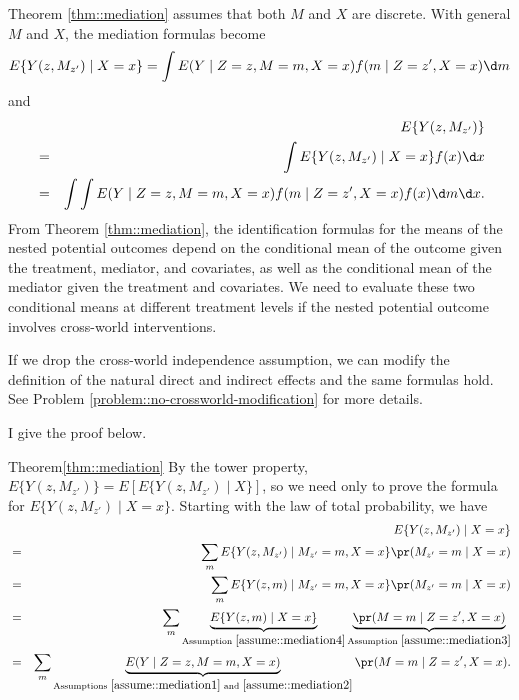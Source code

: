 

Theorem \ref{thm::mediation} assumes that both $M$ and $X$ are discrete. With general $M$ and $X$, the mediation formulas become
$$
E\{ Y(z, M_{z'}) \mid X=x  \} =   \int  E(Y\mid Z=z, M=m, X=x) f ( m \mid Z=z', X=x) \d m
$$
and
\begin{eqnarray*}
&&E\{ Y(z, M_{z'})   \}  \\
 &=& \int E\{ Y(z, M_{z'}) \mid X=x  \}   f  (x) \d x  \\
 &=& \int \int  E(Y\mid Z=z, M=m, X=x) f ( m \mid Z=z', X=x)     f  (x) \d m \d x   . 
\end{eqnarray*}
From Theorem \ref{thm::mediation}, the identification formulas for the means of the nested potential outcomes depend on the conditional mean of the outcome given the treatment, mediator, and covariates, as well as the conditional mean of the mediator given the treatment and covariates. We need to evaluate these two conditional means at different treatment levels if the nested potential outcome involves cross-world interventions. 

If we drop the cross-world independence assumption, we can modify the definition of the natural direct and indirect effects and the same formulas hold. See Problem \ref{problem::no-crossworld-modification} for more details.  

I give the proof below. 
 

\begin{myproof}{Theorem}{\ref{thm::mediation}}
By the tower property, $E\{ Y(z, M_{z'})   \}  =  E[ E\{ Y(z, M_{z'})  \mid X\}  ]$, so we need only to prove the formula for $E\{ Y(z, M_{z'})  \mid X=x\}$. 
Starting with the law of total probability, we have
\begin{eqnarray*}
&& E\{ Y(z, M_{z'})  \mid X=x\}  \\
&=& 
\sum_m E\{ Y(z, M_{z'})  \mid  M_{z'} = m, X=x\} \pr(  M_{z'} = m\mid X=x) \\
&=&
\sum_m E\{ Y(z, m)  \mid  M_{z'} = m, X=x\} \pr(  M_{z'} = m\mid X=x) \\ 
&=& 
\sum_m \underbrace{ E\{ Y(z, m)  \mid    X=x\} }_{\text{Assumption }\ref{assume::mediation4} } 
\underbrace{ \pr(  M  = m\mid Z=z' , X=x) }_{\text{Assumption }\ref{assume::mediation3} } \\ 
&=&
\sum_m \underbrace{E( Y  \mid  Z=z, M=m,   X=x)}_{ \text{Assumptions }\ref{assume::mediation1}\text{ and }\ref{assume::mediation2} } 
\pr(  M  = m\mid Z=z' , X=x) .
\end{eqnarray*}
\end{myproof}


